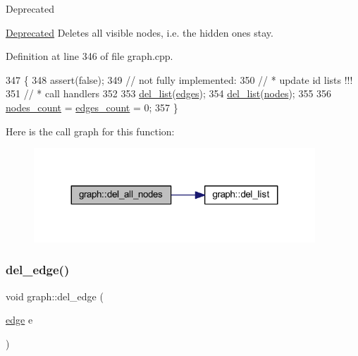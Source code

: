 \begin{DoxyRefDesc}{Deprecated}
\item[\mbox{\hyperlink{deprecated__deprecated000001}{Deprecated}}]Deletes all visible nodes, i.\+e. the hidden ones stay. \end{DoxyRefDesc}


Definition at line 346 of file graph.\+cpp.


\begin{DoxyCode}
347 \{
348     assert(\textcolor{keyword}{false});
349     \textcolor{comment}{// not fully implemented:}
350     \textcolor{comment}{//  * update id lists !!!}
351     \textcolor{comment}{//  * call handlers}
352 
353     \mbox{\hyperlink{classgraph_a23f0a5fb311b7d71bb9dfc4e8aedef35}{del\_list}}(\mbox{\hyperlink{classgraph_ab5b1c610cca1bcf72b05aacc28a48153}{edges}});
354     \mbox{\hyperlink{classgraph_a23f0a5fb311b7d71bb9dfc4e8aedef35}{del\_list}}(\mbox{\hyperlink{classgraph_a4ea0592e8eb7c26c5abad24546907726}{nodes}});
355 
356     \mbox{\hyperlink{classgraph_a1f59223d0bcf647920963d7a661dd74a}{nodes\_count}} = \mbox{\hyperlink{classgraph_af560ff4263ad165c166a46084e781b4a}{edges\_count}} = 0;
357 \}
\end{DoxyCode}
Here is the call graph for this function\+:
\nopagebreak
\begin{figure}[H]
\begin{center}
\leavevmode
\includegraphics[width=299pt]{classgraph_ad0ca1578643a51f96a76a846f14558df_cgraph}
\end{center}
\end{figure}
\mbox{\label{classgraph_ad9356508c49c542dfd4b7169297387c6}} 
\subsubsection{\texorpdfstring{del\+\_\+edge()}{del\_edge()}}
{\footnotesize\ttfamily void graph\+::del\+\_\+edge (\begin{DoxyParamCaption}\item[{\mbox{\hyperlink{classedge}{edge}}}]{e }\end{DoxyParamCaption})\hspace{0.3cm}{\ttfamily [inherited]}}

